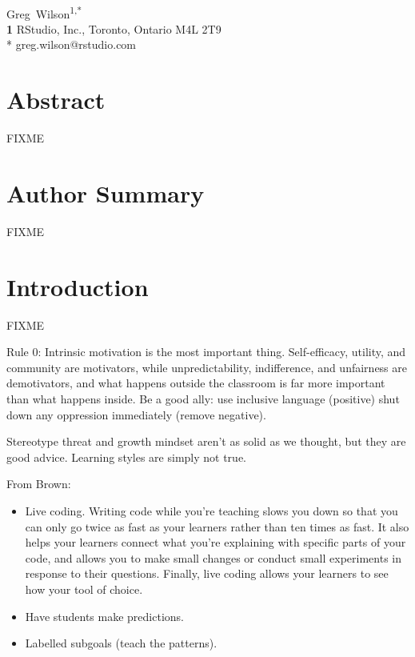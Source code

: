 \documentclass[10pt,letterpaper]{article}
\begin{document}
\vspace*{0.2in}

\begin{flushleft}
{\Large
\textbf{}
}
\newline
\\
{Greg~Wilson}\textsuperscript{1,*}
\\
\textbf{1} RStudio, Inc., Toronto, Ontario M4L 2T9
\\
\bigskip
* greg.wilson@rstudio.com
\end{flushleft}

\section*{Abstract}

FIXME

\section*{Author Summary}

FIXME

\section*{Introduction}

FIXME

Rule 0: Intrinsic motivation is the most important thing.
Self-efficacy, utility, and community are motivators,
while unpredictability, indifference, and unfairness are demotivators,
and what happens outside the classroom is far more important than what happens inside.
Be a good ally:
use inclusive language (positive)
shut down any oppression immediately (remove negative).

Stereotype threat and growth mindset aren't as solid as we thought,
but they are good advice.
Learning styles are simply not true.

From Brown:

\begin{itemize}

\item Live coding.
  Writing code while you're teaching slows you down so that you can only go twice as fast as your learners
  rather than ten times as fast.
  It also helps your learners connect what you're explaining with specific parts of your code,
  and allows you to make small changes or conduct small experiments in response to their questions.
  Finally,
  live coding allows your learners to see how your tool of choice.

\item Have students make predictions.

\item Labelled subgoals (teach the patterns).

\end{itemize}
\end{document}
